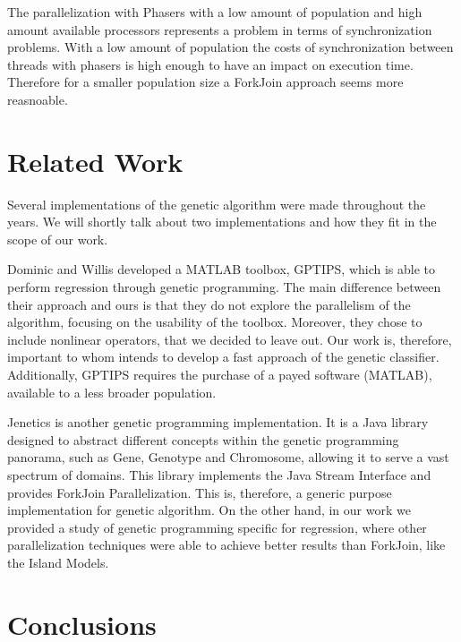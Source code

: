 \documentclass[runningheads]{llncs}
\begin{document}
The parallelization with Phasers with a low amount of population and high amount available processors represents a problem in terms of synchronization problems. With a low amount of population the costs of synchronization between threads with phasers is high enough to have an impact on execution time. Therefore for a smaller population size a ForkJoin approach seems more reasnoable.

\section{Related Work}

Several implementations of the genetic algorithm were made throughout the years. We will shortly talk about two implementations and how they fit in the scope of our work.

Dominic and Willis  \cite{GPTIPS} developed a MATLAB toolbox, GPTIPS, which is able to perform regression through genetic programming. The main difference between their approach and  ours is that they do not explore the parallelism of the algorithm, focusing on the usability of the toolbox. Moreover, they chose to include nonlinear operators, that we decided to leave out. Our work is, therefore, important to whom intends to develop a fast approach of the genetic classifier. Additionally, GPTIPS requires the purchase of a payed software (MATLAB), available to a less broader population.

Jenetics \cite{jenetics} is another genetic programming implementation. It is a Java library designed to abstract different concepts within the genetic programming panorama, such as Gene, Genotype and Chromosome, allowing it to serve a vast spectrum of domains. This library implements the Java Stream Interface and provides ForkJoin Parallelization. This is, therefore, a generic purpose implementation for genetic algorithm. On the other hand, in our work we provided a study of genetic programming specific for regression, where other parallelization techniques were able to achieve better results than ForkJoin, like the Island Models.

\section{Conclusions}
\end{document}
